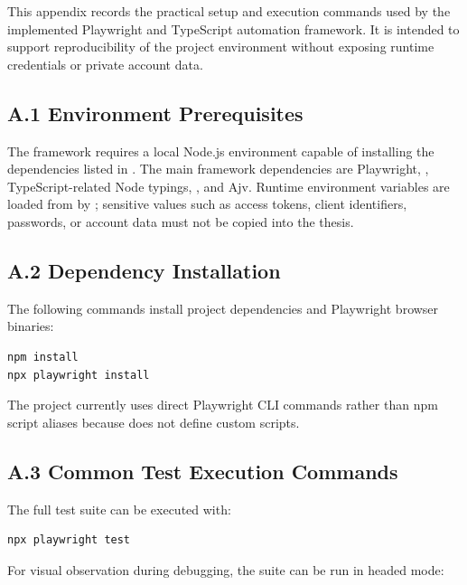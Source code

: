 \label{app:installation}
\begingroup
\sloppy
\setlength{\emergencystretch}{3em}

This appendix records the practical setup and execution commands used by the implemented Playwright and TypeScript automation framework. It is intended to support reproducibility of the project environment without exposing runtime credentials or private account data.

\subsection*{A.1 Environment Prerequisites}

The framework requires a local Node.js environment capable of installing the dependencies listed in . The main framework dependencies are Playwright, , TypeScript-related Node typings, , and Ajv. Runtime environment variables are loaded from  by ; sensitive values such as access tokens, client identifiers, passwords, or account data must not be copied into the thesis.

\subsection*{A.2 Dependency Installation}

The following commands install project dependencies and Playwright browser binaries:

\begin{lstlisting}[language=bash]
npm install
npx playwright install
\end{lstlisting}

The project currently uses direct Playwright CLI commands rather than npm script aliases because  does not define custom scripts.

\subsection*{A.3 Common Test Execution Commands}

The full test suite can be executed with:

\begin{lstlisting}[language=bash]
npx playwright test
\end{lstlisting}

For visual observation during debugging, the suite can be run in headed mode:

